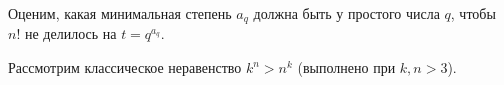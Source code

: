 \begin{itemize}
Оценим, какая минимальная степень $a_q$ должна быть у простого числа $q$, чтобы 
$n!$ не делилось на $t=q^{a_q}$.






Рассмотрим классическое неравенство $k^n > n^k$ (выполнено при $k,n>3$).



%
%
%
%
%
%
%
%
%






%


\end{itemize}
